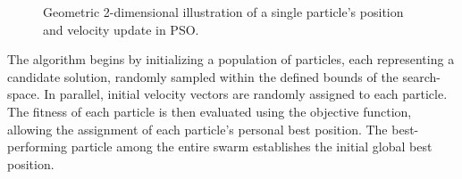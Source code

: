 {\begin{figure}[H]
    \caption[Geometric illustration of PSO's position and velocity update]{Geometric 2-dimensional illustration of a single particle's position and velocity update in PSO.}
    \label{fig:PSO_geometric_illustration}
\end{figure}





The algorithm begins by initializing a population of particles, each representing a candidate solution, randomly sampled within the defined bounds of the \gls{search-space}. In parallel, initial velocity vectors are randomly assigned to each particle. The fitness of each particle is then evaluated using the objective function, allowing the assignment of each particle's personal best position. The best-performing particle among the entire swarm establishes the initial global best position.

}
